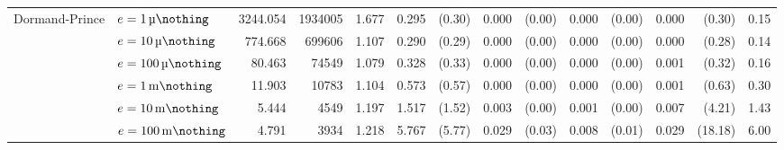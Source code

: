\begin{sidewaystable}[p]
\begin{tabular}{p{1.5cm} l r r r rr rr rr rr r}
	\multirow{6}{*}{\parbox{1.5cm}{\raggedleft Dormand-Prince}}
		& $e=\SI{1}{\micro\nothing}$	&   3244.054	&  1934005	&      1.677	&      0.295	& (0.30)	&      0.000	& (0.00)	&      0.000	& (0.00)	&      0.000	& (0.30)	& 0.15\\
		& $e=\SI{10}{\micro\nothing}$	&    774.668	&   699606	&      1.107	&      0.290	& (0.29)	&      0.000	& (0.00)	&      0.000	& (0.00)	&      0.000	& (0.28)	& 0.14\\
		& $e=\SI{100}{\micro\nothing}$	&     80.463	&    74549	&      1.079	&      0.328	& (0.33)	&      0.000	& (0.00)	&      0.000	& (0.00)	&      0.001	& (0.32)	& 0.16\\
		& $e=\SI{1}{\milli\nothing}$	&     11.903	&    10783	&      1.104	&      0.573	& (0.57)	&      0.000	& (0.00)	&      0.000	& (0.00)	&      0.001	& (0.63)	& 0.30\\
		& $e=\SI{10}{\milli\nothing}$	&      5.444	&     4549	&      1.197	&      1.517	& (1.52)	&      0.003	& (0.00)	&      0.001	& (0.00)	&      0.007	& (4.21)	& 1.43\\
		& $e=\SI{100}{\milli\nothing}$	&      4.791	&     3934	&      1.218	&      5.767	& (5.77)	&      0.029	& (0.03)	&      0.008	& (0.01)	&      0.029	& (18.18)	& 6.00\\
	\bottomrule
\end{tabular}
\label{tbl:integrator_adexp}
\end{sidewaystable}


